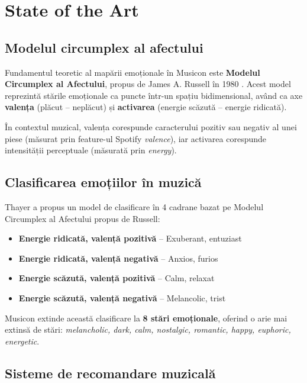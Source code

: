 \documentclass[12pt,a4paper]{article}
\begin{document}
\section{State of the Art}

\subsection{Modelul circumplex al afectului}

Fundamentul teoretic al mapării emoționale în Musicon este \textbf{Modelul Circumplex al Afectului}, propus de James A. Russell în 1980 \cite{russell1980}. Acest model reprezintă stările emoționale ca puncte într-un spațiu bidimensional, având ca axe \textbf{valența} (plăcut -- neplăcut) și \textbf{activarea} (energie scăzută -- energie ridicată).

În contextul muzical, valența corespunde caracterului pozitiv sau negativ al unei piese (măsurat prin feature-ul Spotify \textit{valence}), iar activarea corespunde intensității perceptuale (măsurată prin \textit{energy}).

\subsection{Clasificarea emoțiilor în muzică}

Thayer \cite{thayer1989} a propus un model de clasificare în 4 cadrane bazat pe Modelul Circumplex al Afectului propus de Russell:
\begin{itemize}
    \item \textbf{Energie ridicată, valență pozitivă} -- Exuberant, entuziast
    \item \textbf{Energie ridicată, valență negativă} -- Anxios, furios
    \item \textbf{Energie scăzută, valență pozitivă} -- Calm, relaxat
    \item \textbf{Energie scăzută, valență negativă} -- Melancolic, trist
\end{itemize}

Musicon extinde această clasificare la \textbf{8 stări emoționale}, oferind o arie mai extinsă de stări: \textit{melancholic, dark, calm, nostalgic, romantic, happy, euphoric, energetic}.

\subsection{Sisteme de recomandare muzicală}
\end{document}
